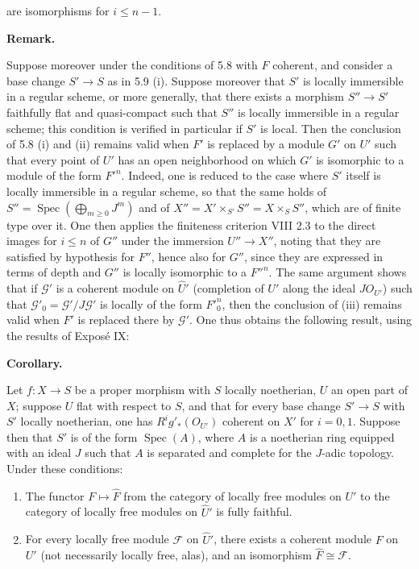 \documentclass[
]{article}
\providecommand{\tightlist}{%
  \setlength{\itemsep}{0pt}\setlength{\parskip}{0pt}}
\begin{document}
are isomorphisms for \(i \leqslant n - 1\).

\textbf{Remark.}

Suppose moreover under the conditions of 5.8 with \(F\) coherent, and
consider a base change \(S' \to S\) as in 5.9 (i). Suppose moreover that
\(S'\) is locally immersible in a regular scheme, or more generally,
that there exists a morphism \(S'' \to S'\) faithfully flat and
quasi-compact such that \(S''\) is locally immersible in a regular
scheme; this condition is verified in particular if \(S'\) is local.
Then the conclusion of 5.8 (i) and (ii) remains valid when \(F'\) is
replaced by a module \(G'\) on \(U'\) such that every point of \(U'\)
has an open neighborhood on which \(G'\) is isomorphic to a module of
the form \(F'^{n}\). Indeed, one is reduced to the case where \(S'\)
itself is locally immersible in a regular scheme, so that the same holds
of \(S'' = \operatorname{Spec}(\bigoplus_{m\geqslant 0} J^{m})\) and of
\(X'' = X' \times_{S'} S'' = X \times_{S} S''\), which are of finite
type over it. One then applies the finiteness criterion VIII 2.3 to the
direct images for \(i \leqslant n\) of \(G''\) under the immersion
\(U'' \to X''\), noting that they are satisfied by hypothesis for
\(F''\), hence also for \(G''\), since they are expressed in terms of
depth and \(G''\) is locally isomorphic to a \(F''^{n}\). The same
argument shows that if \(\mathcal{G}'\) is a coherent module on
\(\hat{U}'\) (completion of \(U'\) along the ideal \(J O_{U'}\)) such
that \(\mathcal{G}'_{0} = \mathcal{G}'/J \mathcal{G}'\) is locally of
the form \(F'^{n}_{0}\), then the conclusion of (iii) remains valid when
\(F'\) is replaced there by \(\mathcal{G}'\). One thus obtains the
following result, using the results of Exposé IX:

\textbf{Corollary.}

Let \(f: X \to S\) be a proper morphism with \(S\) locally noetherian,
\(U\) an open part of \(X\); suppose \(U\) flat with respect to \(S\),
and that for every base change \(S' \to S\) with \(S'\) locally
noetherian, one has \(R^{i}g'_{\ast}(O_{U'})\) coherent on \(X'\) for
\(i = 0, 1\). Suppose then that \(S'\) is of the form
\(\operatorname{Spec}(A)\), where \(A\) is a noetherian ring equipped
with an ideal \(J\) such that \(A\) is separated and complete for the
\(J\)-adic topology. Under these conditions:

\begin{enumerate}
\def\labelenumi{\arabic{enumi}.}
\tightlist
\item
  The functor \(F \mapsto \hat{F}\) from the category of locally free
  modules on \(U'\) to the category of locally free modules on
  \(\hat{U}'\) is fully faithful.
\item
  For every locally free module \(\mathcal{F}\) on \(\hat{U}'\), there
  exists a coherent module \(F\) on \(U'\) (not necessarily locally
  free, alas), and an isomorphism \(\hat{F} \cong \mathcal{F}\).
\end{enumerate}
\end{document}
